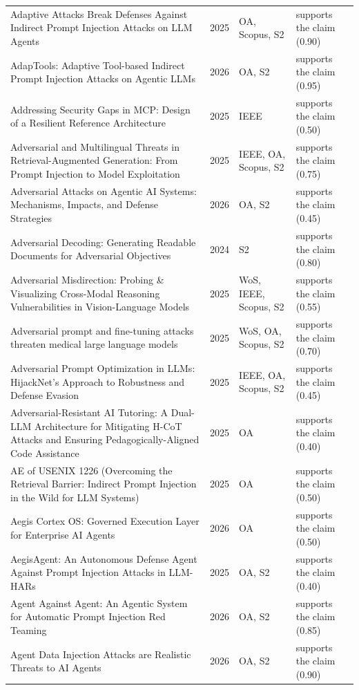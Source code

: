\begin{longtable}{@{}%
  >{\raggedright\arraybackslash}p{}c%
  >{\raggedright\arraybackslash}p{}%
  >{\raggedright\arraybackslash}p{}@{}}
Adaptive Attacks Break Defenses Against Indirect Prompt Injection Attacks on LLM Agents & 2025 & OA, Scopus, S2 & supports the claim (0.90) \\
AdapTools: Adaptive Tool-based Indirect Prompt Injection Attacks on Agentic LLMs & 2026 & OA, S2 & supports the claim (0.95) \\
Addressing Security Gaps in MCP: Design of a Resilient Reference Architecture & 2025 & IEEE & supports the claim (0.50) \\
Adversarial and Multilingual Threats in Retrieval-Augmented Generation: From Prompt Injection to Model Exploitation & 2025 & IEEE, OA, Scopus, S2 & supports the claim (0.75) \\
Adversarial Attacks on Agentic AI Systems: Mechanisms, Impacts, and Defense Strategies & 2026 & OA, S2 & supports the claim (0.45) \\
Adversarial Decoding: Generating Readable Documents for Adversarial Objectives & 2024 & S2 & supports the claim (0.80) \\
Adversarial Misdirection: Probing \& Visualizing Cross-Modal Reasoning Vulnerabilities in Vision-Language Models & 2025 & WoS, IEEE, Scopus, S2 & supports the claim (0.55) \\
Adversarial prompt and fine-tuning attacks threaten medical large language models & 2025 & WoS, OA, Scopus, S2 & supports the claim (0.70) \\
Adversarial Prompt Optimization in LLMs: HijackNet's Approach to Robustness and Defense Evasion & 2025 & IEEE, OA, Scopus, S2 & supports the claim (0.45) \\
Adversarial-Resistant AI Tutoring: A Dual-LLM Architecture for Mitigating H-CoT Attacks and Ensuring Pedagogically-Aligned Code Assistance & 2025 & OA & supports the claim (0.40) \\
AE of USENIX 1226 (Overcoming the Retrieval Barrier: Indirect Prompt Injection in the Wild for LLM Systems) & 2025 & OA & supports the claim (0.50) \\
Aegis Cortex OS: Governed Execution Layer for Enterprise AI Agents & 2026 & OA & supports the claim (0.50) \\
AegisAgent: An Autonomous Defense Agent Against Prompt Injection Attacks in LLM-HARs & 2025 & OA, S2 & supports the claim (0.40) \\
Agent Against Agent: An Agentic System for Automatic Prompt Injection Red Teaming & 2026 & OA, S2 & supports the claim (0.85) \\
Agent Data Injection Attacks are Realistic Threats to AI Agents & 2026 & OA, S2 & supports the claim (0.90) \\

\end{longtable}
